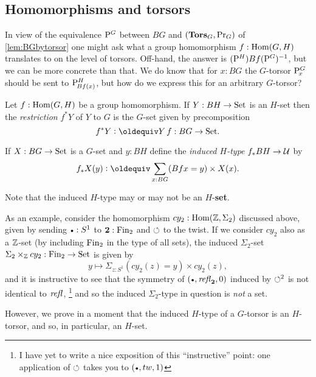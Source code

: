 \subsection{Homomorphisms and torsors}
\label{sec:homotor}
In view of the equivalence $\mathrm{P}_{\!}^G$ between $BG$ and $(\mathbf{Tors}_G,\mathrm{Pr}_{{G}})$ of \cref{lem:BGbytorsor} one might ask what a group homomorphism  $f:\mathrm{Hom}(G,H)$ translates to on the level of torsors.  Off-hand, the answer is $(\mathrm{P}_{\!}^H)Bf(\mathrm{P}_{\!}^G)^{-1}$, but we can be more concrete than that.  We do know that for $x:BG$ the $G$-torsor $\mathrm{P}_{\!x}^G$ should be sent to $\mathrm{P}_{\!Bf(x)}^H$, but how do we express this for an arbitrary $G$-torsor?
\begin{definition}
  \label{def:restrictandinduce}
  Let $f:\mathrm{Hom}(G,H)$ be a group homomorphism.  If $Y:BH\to\mathord{\mathrm{Set}}$ is an $H$-set then the \emph{restriction} $f^*Y$ of $Y$ to $G$ is the $G$-set given by precomposition 
$$f^*Y\defequi Y\, f:BG\to\Set.$$  

If $X:BG\to\mathord{\mathrm{Set}}$ is a $G$-set and $y:BH$ define 
the \emph{induced $H$-type} $f_*BH\to\mathcal{U}$ by
$$f_*X(y)\defequi\sum_{x:BG}(Bf x =y)\times X(x).$$
\end{definition}
\begin{remark}
  Note that the induced $H$-type may or may not be an $H$-{\bf set}.

  As an example, consider the homomorphism $cy_2:\mathrm{Hom}(\mathbb{Z},\Sigma_2)$ discussed above, given by sending $\base:S^1$ to $\mathbf{2}:\operatorname{Fin}_2$ and $\circlearrowleft$ to the twist.
  If we consider $cy_2$ also as a $\mathbb{Z}$-set (by including $\operatorname{Fin}_2$ in the type of all sets), the induced $\Sigma_2$-set $\Sigma_2\times_{\mathbb{Z}}cy_2:\operatorname{Fin}_2\to\mathord{\mathrm{Set}}$ is given by 
  $$y\mapsto \Sigma_{z:S^1}(cy_2(z)=y)\times cy_2(z),$$
  and it is instructive to see that the symmetry of $(\base,\refl{\bn 2},0)$
  induced by $\circlearrowleft^2$ is not identical to $\mathop{\mathit{refl}_{}}$,
  \footnote{I have yet to write a nice exposition of this ``instructive'' point: one application of $\circlearrowleft$ takes you to $(\base,tw,1)$}
  and so the induced $\Sigma_2$-type in question is \emph{not} a set.  
  
  However, we prove in a moment that the induced $H$-type of a $G$-torsor is an $H$-torsor, and so, in particular, an $H$-set.
\end{remark}

